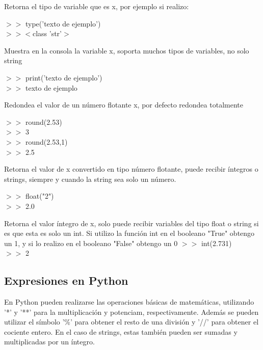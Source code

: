 \documentclass[10pt,a4paper]{article}
\begin{document}
\begin{description}[align=right,labelwidth=1cm,labelsep=0.5cm, itemindent=0cm]


\item [type(x)] Retorna el tipo de variable que es x, por ejemplo si realizo:

    $>>$    type('texto de ejemplo')\\
    $>>$$   <$class 'str'$>$

\item [print(x)] Muestra en la consola la variable x, soporta muchos tipos de variables, no solo string

    $>>$ print('texto de ejemplo')\\
    $>>$ texto de ejemplo

\item [round(x)] Redondea el valor de un número flotante x, por defecto redondea totalmente

    $>>$ round(2.53)\\
    $>>$ 3\\
    $>>$ round(2.53,1)\\
    $>>$ 2.5

\item [float(x)] Retorna el valor de x convertido en tipo número flotante, puede recibir íntegros o strings, siempre y cuando la string sea solo un número.

    $>>$ float("2")\\
    $>>$ 2.0
    
\item [int(x)] Retorna el valor íntegro de x, solo puede recibir variables del tipo float o string si es que esta es solo un int. Si utilizo la función int en el booleano "True" obtengo un 1, y si lo realizo en el booleano "False" obtengo un 0
    $>>$ int(2.731)\\
    $>>$ 2
    

\end{description}

\subsection{Expresiones en Python}
En Python pueden realizarse las operaciones básicas de matemáticas, utilizando '*' y '**' para la multiplicación y potenciam, respectivamente. Además se pueden utilizar el símbolo '\%' para obtener el resto de una división y '//' para obtener el cociente entero. En el caso de strings, estas también pueden ser sumadas y multiplicadas por un íntegro.
\end{document}
